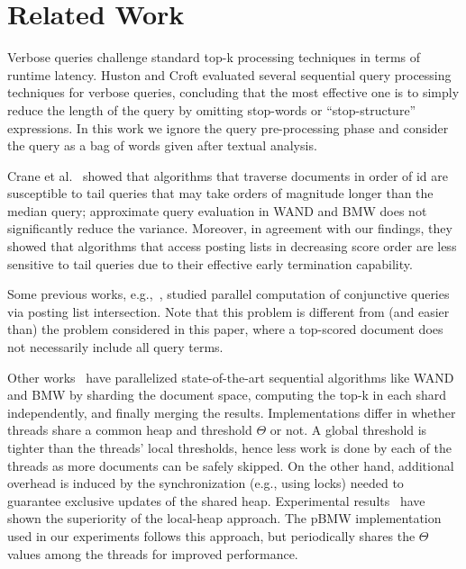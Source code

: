 \section{Related Work}
\label{sec:related}

Verbose queries challenge standard top-k processing techniques in terms of runtime latency. Huston and Croft \cite{Huston:2010} evaluated several sequential query processing techniques for verbose queries, concluding that the most effective one is to simply reduce the length of the query by omitting stop-words or ``stop-structure'' expressions. 
In this work we ignore the query pre-processing phase and consider the query as a bag of words given after textual analysis.

Crane et al.~\cite{Crane:2017} showed that  algorithms that traverse documents in order of id 
are susceptible to tail queries that may take orders of magnitude longer than the median query; approximate query evaluation in WAND and BMW does not significantly reduce the variance. Moreover, in agreement with our findings, they showed that algorithms that access  posting lists in decreasing score order are less sensitive to tail queries due to their effective early termination capability. 

Some previous works,  e.g.,~\cite{Tatikonda:2011,Liu:2018:GUC:3178487.3178512}, studied parallel computation  of conjunctive queries  via posting list intersection. 
Note that this problem is different from (and easier than) the problem considered in this paper, where a top-scored document does not necessarily include all query terms. 

Other works~\cite{Bonacic:2010,rojas2013efficient} have parallelized state-of-the-art sequential algorithms like WAND and BMW  by sharding the document space, computing the top-k in each shard independently, and finally merging the results.  Implementations differ in whether threads share a common  
heap and  threshold $\Theta$ or not. A global threshold is  tighter than the threads' local thresholds, hence  less work is done by each of the threads as  more documents can be safely skipped. 
On the other hand, additional overhead is induced by the synchronization (e.g., using locks) needed to guarantee exclusive updates of the shared heap. 
Experimental results~\cite{rojas2013efficient} have shown the superiority of the local-heap approach. The pBMW implementation used in our experiments follows this approach,
but periodically shares the  $\Theta$ values among the threads for improved performance.

